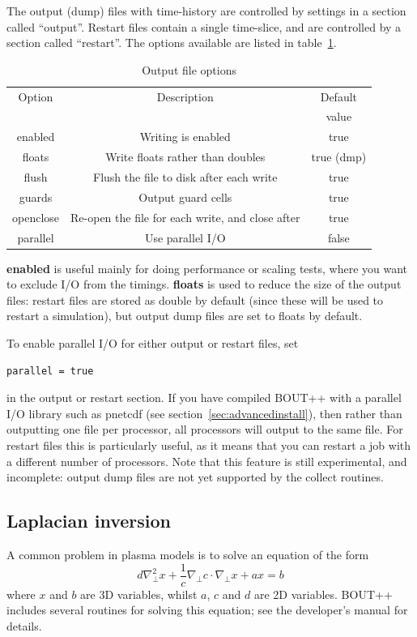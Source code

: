 \documentclass[12pt]{article}
\begin{document}
The output (dump) files with time-history are controlled by settings in a section called ``output''.
Restart files contain a single time-slice, and are controlled by a section called ``restart''. The options
available are listed in table~\ref{tab:outputopts}.

\begin{table}[htb!]
\centering
\caption{Output file options}
\label{tab:outputopts}
\begin{tabular}{c | c | c}
\hline
Option & Description & Default\\
       &             & value\\
\hline
enabled & Writing is enabled & true \\
floats & Write floats rather than doubles & true (dmp)\\
flush & Flush the file to disk after each write & true \\
guards & Output guard cells & true \\
openclose & Re-open the file for each write, and close after & true \\
parallel & Use parallel I/O & false \\
\hline
\end{tabular}
\end{table}

{\bf enabled} is useful mainly for doing performance or scaling tests, where you want to exclude
I/O from the timings. {\bf floats} is used to reduce the size of the output files: restart files are
stored as double by default (since these will be used to restart a simulation), but output dump files
are set to floats by default.

To enable parallel I/O for either output or restart files, set
\begin{lstlisting}
parallel = true
\end{lstlisting}
in the output or restart section. If you have compiled BOUT++ with a parallel I/O library
such as pnetcdf (see section~\ref{sec:advancedinstall}), then rather than outputting one file per processor, all
processors will output to the same file. For restart files this is particularly useful,
as it means that you can restart a job with a different number of processors.
Note that this feature is still experimental, and incomplete: output dump files are
not yet supported by the collect routines.

\subsection{Laplacian inversion}
A common problem in plasma models is to solve an equation of the form
\[
d\nabla^2_\perp x + \frac{1}{c}\nabla_\perp c\cdot\nabla_\perp x + a x = b
\]
where $x$ and $b$ are 3D variables, whilst $a$, $c$ and $d$ are 2D variables.
BOUT++ includes several routines for solving this equation; see the
developer's manual for details.
\end{document}
